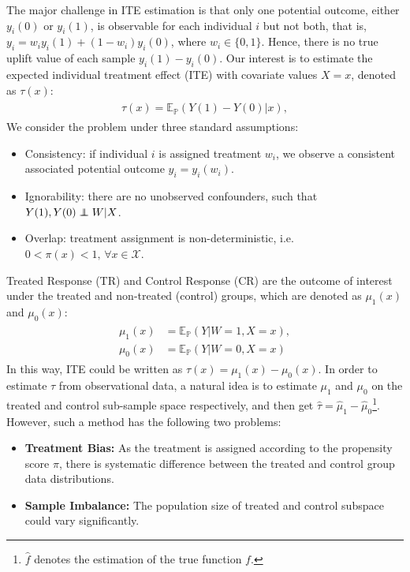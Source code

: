 \documentclass[sigconf]{acmart}
\newcommand\independent{\protect\mathpalette{\protect\independenT}{\perp}}
\def\independenT#1#2{\mathrel{\rlap{$#1#2$}\mkern2mu{#1#2}}}
\begin{document}
The major challenge in ITE estimation is that only one potential outcome, either $y_i(0)$ or $y_i(1)$, is observable for each individual $i$ but not both, that is, $y_i = w_i y_i(1) + (1 - w_i) y_i(0)$, where $w_i \in \{0,1\}$. Hence, there is no true uplift value of each sample $y_i(1) -y_i(0)$. Our interest is to estimate the expected individual treatment effect (ITE) with covariate values $X = x$, denoted as $\tau(x)$:
\begin{align}
\begin{aligned}
\tau(x) = \mathbb{E}_\mathbb{P}(Y(1)-Y(0)|x),
\end{aligned}
\end{align}
We consider the problem under three standard assumptions:
\begin{itemize}
    \item Consistency: if individual $i$ is assigned treatment $w_i$, we observe
    a consistent associated potential outcome $y_i=y_i(w_i)$. 
    \item Ignorability: there are no unobserved confounders, such that $Y(1), Y(0) \independent W | X$. 
    \item Overlap: treatment assignment is non-deterministic, i.e. $0 < \pi(x) < 1 \text{, }\forall x\in \mathcal{X}$. 
\end{itemize}
Treated Response (TR) and Control Response (CR) are the outcome of interest under the treated and non-treated (control) groups, which are denoted as $\mu_1(x)$ and $\mu_0(x)$:
\begin{align}
\begin{aligned}
\mu_1(x) &= \mathbb{E}_\mathbb{P}(Y|W=1,X=x),  \\
\mu_0(x) &= \mathbb{E}_\mathbb{P}(Y|W=0,X=x)  
\end{aligned}
\end{align}
In this way, ITE could be written as $\tau(x) = \mu_1(x) - \mu_0(x)$. In order to estimate $\tau$ from observational data, a natural idea is to estimate $\mu_1$ and $\mu_0$ on the treated and control sub-sample space respectively,  and then get $\hat\tau = \hat\mu_1 - \hat\mu_0$\footnote{$\hat{f}$ denotes the estimation of the true function $f$.}. However, such a method has the following two problems:

\begin{itemize}
    \item \textbf{Treatment Bias:} As the treatment is assigned according to the propensity score $\pi$, there is systematic difference between the treated and control group data distributions.
    \item \textbf{Sample Imbalance:} The population size of treated and control subspace could vary significantly. 
\end{itemize}
\end{document}
